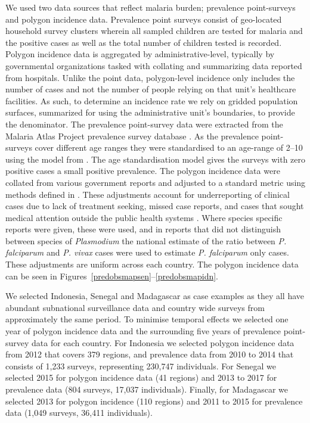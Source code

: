 \documentclass{statsoc}
\begin{document}
We used two data sources that reflect malaria burden; prevalence point-surveys and polygon incidence data.
Prevalence point surveys consist of geo-located household survey clusters wherein all sampled children are tested for malaria and the positive cases as well as the total number of children tested is recorded. 
Polygon incidence data is aggregated by administrative-level, typically by governmental organizations tasked with collating and summarizing data reported from hospitals. 
Unlike the point data, polygon-level incidence only includes the number of cases and not the number of people relying on that unit’s healthcare facilities.  
As such, to determine an incidence rate we rely on gridded population surfaces, summarized for using the administrative unit’s boundaries, to provide the denominator. 
The prevalence point-survey data were extracted from the Malaria Atlas Project prevalence survey database  \citep{bhatt2015effect, guerra2007assembling, pfeffer2018ma}. 
As the prevalence point-surveys cover different age ranges they were standardised to an age-range of 2--10 using the model from \citep{smith2007standardizing}. 
The age standardisation model gives the surveys with zero positive cases a small positive prevalence. 
The polygon incidence data were collated from various government reports and adjusted to a standard metric using methods defined in \citep{cibulskis2011worldwide, weiss2019mapping}. 
These adjustments account for underreporting of clinical cases due to lack of treatment seeking, missed case reports, and cases that sought medical attention outside the public health systems \citep{battle2016treatment}. 
Where species specific reports were given, these were used, and in reports that did not distinguish between species of \emph{Plasmodium} the national estimate of the ratio between \emph{P. falciparum} and \emph{P. vivax} cases were used to estimate \emph{P. falciparum} only cases. 
These adjustments are uniform across each country. 
The polygon incidence data can be seen in Figures~\ref{predobsmapsen}--\ref{predobsmapidn}.


We selected Indonesia, Senegal and Madagascar as case examples as they all have abundant subnational surveillance data and country wide surveys from approximately the same period.
To minimise temporal effects we selected one year of polygon incidence data and the surrounding five years of prevalence point-survey data for each country.
For Indonesia we selected polygon incidence data from 2012 that covers 379 regions, and prevalence data from 2010 to 2014 that consists of 1,233 surveys, representing 230,747 individuals.
For Senegal we selected 2015 for polygon incidence data (41 regions) and 2013 to 2017 for prevalence data (804 surveys, 17,037 individuals).
Finally, for Madagascar we selected 2013 for polygon incidence (110 regions) and 2011 to 2015 for prevalence data (1,049 surveys, 36,411 individuals).
\end{document}
